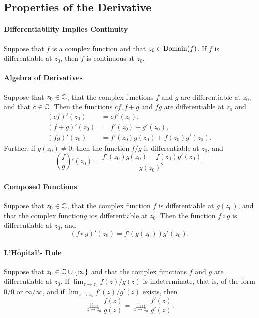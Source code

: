\subsection{Properties of the Derivative}
\paragraph{Differentiability Implies Continuity}
Suppose that \(f\) is a complex function and that \(z_0 \in \mathrm{Domain}(f)\). If \(f\) is differentiable at \(z_0\), then \(f\) is continuous at \(z_0\).

\paragraph{Algebra of Derivatives}
Suppose that \(z_0 \in \mathbb{C}\), that the complex functions \(f\) and \(g\) are differentiable at \(z_0\), and that \(c \in \mathbb{C}\). Then the functions \(cf, f + g\) and \(fg\) are differentiable at \(z_0\) and
\begin{align*}
    (cf)'(z_0) & = cf'(z_0), \\
    (f + g)'(z_0) & = f'(z_0) + g'(z_0), \\
    (fg)'(z_0) & = f'(z_0)g(z_0) + f(z_0)g'(z_0).
\end{align*}
Further, if \(g(z_0) \neq 0\), then the function \(f/g\) is differentiable at \(z_0\), and
\[\left(\frac{f}{g}\right)'(z_0) = \frac{f'(z_0)g(z_0) - f(z_0)g'(z_0)}{g(z_0)^2}.\]

\paragraph{Composed Functions}
Suppose that \(z_0 \in \mathbb{C}\), that the complex function \(f\) is differentiable at \(g(z_0)\), and that the complex function\(g\) ios differentiable at \(z_0\). Then the function \(f \circ g\) is differentiable at \(z_0\), and
\[(f \circ g)'(z_0) = f'(g(z_0))g'(z_0).\]

\paragraph{L'H\(\hat{\mathbf{o}}\)pital's Rule}
Suppose that \(z_0 \in \mathbb{C} \cup \{\infty\}\) and that the complex functions \(f\) and \(g\) are differentiable at \(z_0\). If \(\lim_{z \to z_0} f(z) / g(z)\) is indeterminate, that is, of the form \(0 / 0\) or \(\infty / \infty\), and if \(\lim_{z \to z_0} f'(z) / g'(z)\) exists, then
\[\lim_{z \to z_0} \frac{f(z)}{g(z)} = \lim_{z \to z_0}\frac{f'(z)}{g'(z)}.\]

